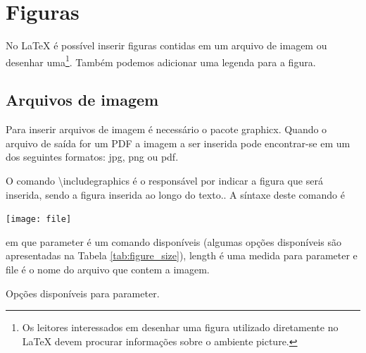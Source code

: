 % 
% 
% 
% 
% 
\chapter{Figuras}
No LaTeX é possível inserir figuras contidas em um arquivo de imagem ou desenhar uma\footnote{Os leitores interessados em desenhar uma figura utilizado diretamente no LaTeX devem procurar informações sobre o ambiente \textsf{picture}.}. Também podemos adicionar uma legenda para a figura.

\section{Arquivos de imagem}

Para inserir arquivos de imagem é necessário o pacote \textsf{graphicx}. Quando o arquivo de saída for um \textsf{PDF} a imagem a ser inserida pode encontrar-se em um dos seguintes formatos: \textsf{jpg}, \textsf{png} ou \textsf{pdf}.

O comando \textbackslash\textsf{includegraphics} é o responsável por indicar a figura que será inserida, sendo a figura inserida ao longo do texto.. A síntaxe deste comando é
\begin{latexcode}
    \texttt{[image: file]}
\end{latexcode}
em que \textsf{parameter} é um comando disponíveis (algumas opções disponíveis são apresentadas na Tabela \ref{tab:figure_size}), \textsf{length} é uma medida para \textsf{parameter} e \textsf{file} é o nome do arquivo que contem a imagem.
\begin{table}[!htb]
    \centering
    \caption{Opções disponíveis para \textsf{parameter}.}
    \label{tab:figure_size}
    
\end{table}

